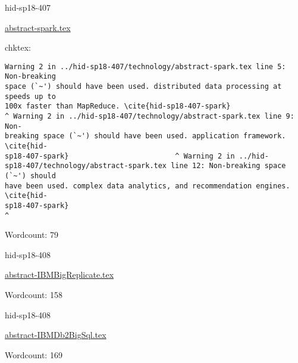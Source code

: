 

\begin{IU}

hid-sp18-407

\href{https://github.com/cloudmesh-community/hid-sp18-407/blob/master//technology/abstract-spark.tex}{abstract-spark.tex}

 
chktex:
\begin{tiny}
\begin{verbatim}
Warning 2 in ../hid-sp18-407/technology/abstract-spark.tex line 5: Non-breaking
space (`~') should have been used. distributed data processing at speeds up to
100x faster than MapReduce. \cite{hid-sp18-407-spark}
^ Warning 2 in ../hid-sp18-407/technology/abstract-spark.tex line 9: Non-
breaking space (`~') should have been used. application framework. \cite{hid-
sp18-407-spark}                         ^ Warning 2 in ../hid-
sp18-407/technology/abstract-spark.tex line 12: Non-breaking space (`~') should
have been used. complex data analytics, and recommendation engines.  \cite{hid-
sp18-407-spark}                                                       ^
\end{verbatim}
\end{tiny}

Wordcount: 79

\end{IU}



\begin{IU}

hid-sp18-408

\href{https://github.com/cloudmesh-community/hid-sp18-408/blob/master//technology/abstract-IBMBigReplicate.tex}{abstract-IBMBigReplicate.tex}

 

Wordcount: 158

\end{IU}



\begin{IU}

hid-sp18-408

\href{https://github.com/cloudmesh-community/hid-sp18-408/blob/master//technology/abstract-IBMDb2BigSql.tex}{abstract-IBMDb2BigSql.tex}

 

Wordcount: 169

\end{IU}

